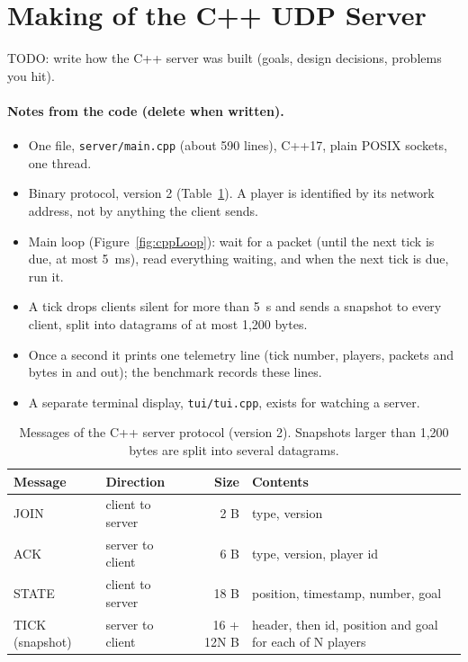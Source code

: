 \section{Making of the C++ UDP Server}
TODO: write how the C++ server was built (goals, design decisions, problems you hit).

\paragraph{Notes from the code (delete when written).}
\begin{itemize}
\item One file, \texttt{server/main.cpp} (about 590 lines), C++17, plain POSIX sockets, one thread.
\item Binary protocol, version 2 (Table~\ref{tab:packets}). A player is identified by its network address, not by anything the client sends.
\item Main loop (Figure~\ref{fig:cppLoop}): wait for a packet (until the next tick is due, at most 5~ms), read everything waiting, and when the next tick is due, run it.
\item A tick drops clients silent for more than 5~s and sends a snapshot to every client, split into datagrams of at most 1,200 bytes.
\item Once a second it prints one telemetry line (tick number, players, packets and bytes in and out); the benchmark records these lines.
\item A separate terminal display, \texttt{tui/tui.cpp}, exists for watching a server.
\end{itemize}

\begin{table}[H]
\centering
\small
\begin{tabular}{@{}llrl@{}}
\toprule
Message & Direction & Size & Contents \\
\midrule
JOIN & client to server & 2 B & type, version \\
ACK & server to client & 6 B & type, version, player id \\
STATE & client to server & 18 B & position, timestamp, number, goal \\
TICK (snapshot) & server to client & 16 + 12N B & header, then id, position and goal for each of N players \\
\bottomrule
\end{tabular}
\caption{Messages of the C++ server protocol (version 2). Snapshots larger than 1,200 bytes are split into several datagrams.}
\label{tab:packets}
\end{table}

